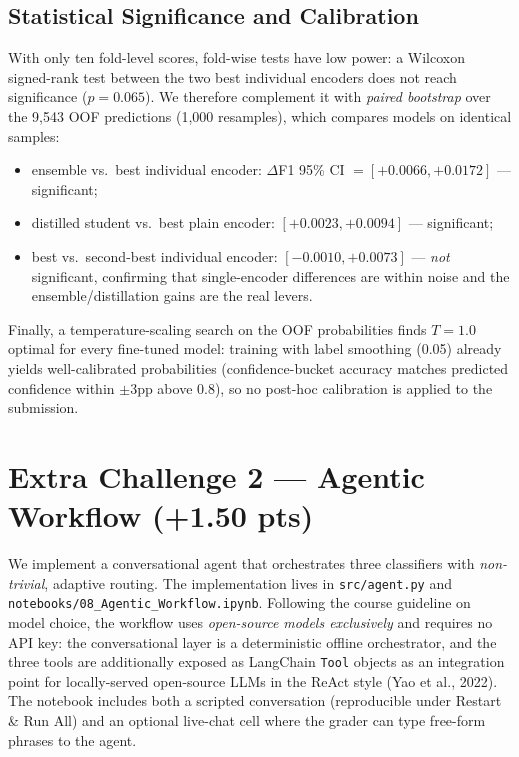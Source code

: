 \documentclass[11pt,a4paper]{article}
\begin{document}
\subsection{Statistical Significance and Calibration}
With only ten fold-level scores, fold-wise tests have low power: a Wilcoxon signed-rank test
between the two best individual encoders does not reach significance ($p=0.065$). We therefore
complement it with \emph{paired bootstrap} over the 9{,}543 OOF predictions (1{,}000 resamples),
which compares models on identical samples:
\begin{itemize}
  \item ensemble vs.\ best individual encoder: $\Delta$F1 95\% CI $=[+0.0066, +0.0172]$ --- significant;
  \item distilled student vs.\ best plain encoder: $[+0.0023, +0.0094]$ --- significant;
  \item best vs.\ second-best individual encoder: $[-0.0010, +0.0073]$ --- \emph{not} significant,
  confirming that single-encoder differences are within noise and the ensemble/distillation gains
  are the real levers.
\end{itemize}
Finally, a temperature-scaling search on the OOF probabilities finds $T{=}1.0$ optimal for every
fine-tuned model: training with label smoothing (0.05) already yields well-calibrated
probabilities (confidence-bucket accuracy matches predicted confidence within $\pm$3pp above 0.8),
so no post-hoc calibration is applied to the submission.

\section{Extra Challenge 2 --- Agentic Workflow (+1.50 pts)}
We implement a conversational agent that orchestrates three classifiers with \emph{non-trivial},
adaptive routing. The implementation lives in \nolinkurl{src/agent.py} and
\nolinkurl{notebooks/08_Agentic_Workflow.ipynb}. Following the course guideline on model choice,
the workflow uses \emph{open-source models exclusively} and requires no API key: the
conversational layer is a deterministic offline orchestrator, and the three tools are additionally
exposed as LangChain \texttt{Tool} objects as an integration point for locally-served open-source
LLMs in the ReAct style (Yao et al., 2022). The notebook includes both a scripted conversation
(reproducible under Restart \& Run All) and an optional live-chat cell where the grader can type
free-form phrases to the agent.
\end{document}
